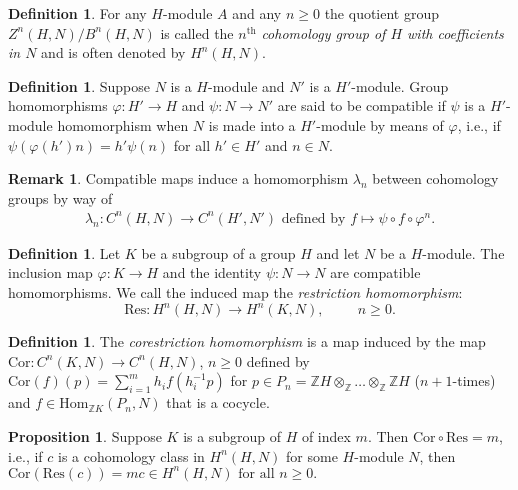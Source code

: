 \documentclass{article}
\newcommand{\Z}{\mathbb{Z}}
\theoremstyle{definition}
\newtheorem{defn}[theorem]{Definition}
\newtheorem{prop}[theorem]{Proposition}
\newtheorem{remark}[theorem]{Remark}
\begin{document}
\begin{defn}
    For any $H$-module $A$ and any $n \geq 0$ the quotient group $Z^n(H,N)/B^n(H,N)$ is called the $n^{\text{th}}$ \emph{cohomology group of $H$ with coefficients in $N$} and is often denoted by $H^n(H,N)$. 
\end{defn}


\begin{defn}
    Suppose $N$ is a $H$-module and $N'$ is a $H'$-module. Group homomorphisms $\varphi : H' \to H$ and $\psi : N \to N'$ are said to be compatible if $\psi$ is a $H'$-module homomorphism when $N$ is made into a $H'$-module by means of $\varphi$, i.e., if $\psi(\varphi(h')n) = h'\psi(n)$ for all $h' \in H'$ and $n \in N$. 
\end{defn}

\begin{remark}
    Compatible maps induce a homomorphism $\lambda_n$ between cohomology groups by way of 
    \begin{align*}
        \lambda_n : C^n(H, N) \to C^n(H', N') \text{ defined by } f \mapsto \psi \circ f \circ \varphi^n.
    \end{align*}
\end{remark}

\begin{defn}
    Let $K$ be a subgroup of a group $H$ and let $N$ be a $H$-module. The inclusion map $\varphi : K \to H$ and the identity $\psi : N \to N$ are compatible homomorphisms. We call the induced map the \emph{restriction homomorphism}:
    $$\text{Res} : H^n(H, N) \to H^n(K, N), \hspace{1cm} n \geq 0.$$
\end{defn}

\begin{defn}
    The \emph{corestriction homomorphism} is a map induced by the map $\text{Cor} : C^n(K, N) \to C^n(H, N)$, $n \geq 0$ defined by 
    $\text{Cor}(f)(p) = \sum_{i = 1}^m h_i f(h_i^{-1} p)$
    for $p \in P_n = \Z H \otimes_{\Z} \ldots \otimes_{\Z} \Z H$ ($n+1$-times) and $f \in \text{Hom}_{\Z K} (P_n, N)$ that is a cocycle. 
\end{defn}

\begin{prop}
    Suppose $K$ is a subgroup of $H$ of index $m$. Then $\text{Cor} \circ \text{Res} = m$, i.e., if $c$ is a cohomology class in $H^n(H, N)$ for some $H$-module $N$, then 
    $\text{Cor}(\text{Res}(c)) = mc \in H^n(H, N) \text{ for all } n \geq 0.$
\end{prop}
\end{document}
